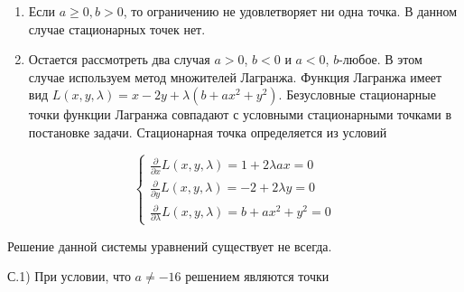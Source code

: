 \documentclass[addpoints, answers]{exam} %
\begin{document}
\begin{questions}
\begin{solution}
\begin{enumerate}
\item  Если $a\ge 0,b>0$, то ограничению не удовлетворяет ни одна точка. В данном случае стационарных точек нет.

\item  Остается рассмотреть два случая $a>0$, $b<0$ и $a<0$, $b$-любое. В этом случае используем метод множителей Лагранжа. Функция Лагранжа имеет вид $L\left(x,y,\lambda \right)=x-2y+\lambda \left(b+ax^{2} +y^{2} \right)$. Безусловные стационарные точки функции Лагранжа совпадают с условными стационарными точками в постановке задачи. Стационарная точка определяется из условий
\end{enumerate}

\[
\left\{\begin{array}{c} {\frac{\partial }{\partial x} L\left(x,y,\lambda \right)=1+2\lambda ax=0} \\ {\frac{\partial }{\partial y} L\left(x,y,\lambda \right)=-2+2\lambda y=0} \\ {\frac{\partial }{\partial \lambda } L\left(x,y,\lambda \right)=b+ax^{2} +y^{2} =0} \end{array}\right.
\]

Решение данной системы уравнений существует не всегда.

С.1) При условии, что $a\ne -16$ решением являются точки


\end{solution}
\end{questions}
\end{document}
